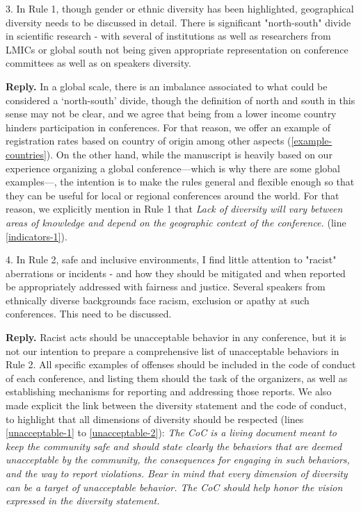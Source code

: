 \documentclass{article}
\newenvironment{Reply}{\noindent\color{BlueViolet}\textbf{Reply.}}{\vspace{1em}}
\begin{document}
3. In Rule 1, though gender or ethnic diversity has been highlighted, geographical diversity needs to be discussed in detail. There is significant "north-south" divide in scientific research - with several of institutions as well as researchers from LMICs or global south not being given appropriate representation on conference committees as well as on speakers diversity.

\begin{Reply}
   In a global scale, there is an imbalance associated to what could be considered a `north-south' divide, though the definition of north and south in this sense may not be clear, and we agree that being from a lower income country hinders participation in conferences. For that reason, we offer an example of registration rates based on country of origin among other aspects (\ref{example-countries}). 
   On the other hand, while the manuscript is heavily based on our experience organizing a global conference—which is why there are some global examples—, the intention is to make the rules general and flexible enough so that they can be useful for local or regional conferences around the world. 
   For that reason, we explicitly mention in Rule 1 that \textit{Lack of diversity will vary between areas of knowledge and depend on the geographic context of the conference.} (line \ref{indicators-1}). 

\end{Reply}

4. In Rule 2, safe and inclusive environments, I find little attention to "racist" aberrations or incidents - and how they should be mitigated and when reported be appropriately addressed with fairness and justice.
Several speakers from ethnically diverse backgrounds face racism, exclusion or apathy at such conferences. This need to be discussed.

\begin{Reply}
    Racist acts should be unacceptable behavior in any conference, but it is not our intention to prepare a comprehensive list of unacceptable behaviors in Rule 2.
    All specific examples of offenses should be included in the code of conduct of each conference, and listing them should the task of the organizers, as well as establishing mechanisms for reporting and addressing those reports.
    We also made explicit the link between the diversity statement and the code of conduct, to highlight that all dimensions of diversity should be respected (lines \ref{unacceptable-1} to \ref{unacceptable-2}):
    \textit{The CoC is a living document meant to keep the community safe and should state clearly the behaviors that are deemed unacceptable by the community, the consequences for engaging in such behaviors, and the way to report violations. Bear in mind that every dimension of diversity can be a target of unacceptable behavior. The CoC should help honor the vision expressed in the diversity statement.}
\end{Reply}
\end{document}
